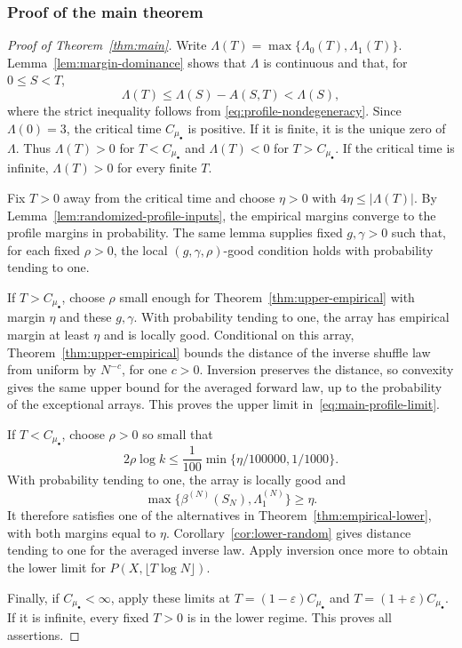 \subsubsection{Proof of the main theorem}

\begin{proof}[Proof of Theorem~\ref{thm:main}]
Write $\Lambda(T)=\max\{\Lambda_0(T),\Lambda_1(T)\}$.
Lemma~\ref{lem:margin-dominance} shows that $\Lambda$ is continuous and
that, for $0\le S<T$,
\[
 \Lambda(T)\le\Lambda(S)-A(S,T)<\Lambda(S),
\]
where the strict inequality follows from
\eqref{eq:profile-nondegeneracy}. Since $\Lambda(0)=3$, the critical
time $C_{\mu_\bullet}$ is positive. If it is finite, it is the unique
zero of $\Lambda$. Thus $\Lambda(T)>0$ for $T<C_{\mu_\bullet}$ and
$\Lambda(T)<0$ for $T>C_{\mu_\bullet}$. If the critical time is
infinite, $\Lambda(T)>0$ for every finite $T$.

Fix $T>0$ away from the critical time and choose $\eta>0$ with
$4\eta\le|\Lambda(T)|$. By
Lemma~\ref{lem:randomized-profile-inputs}, the empirical margins
converge to the profile margins in probability. The same lemma supplies
fixed $g,\gamma>0$ such that, for each fixed $\rho>0$, the local
$(g,\gamma,\rho)$-good condition holds with probability tending to one.

If $T>C_{\mu_\bullet}$, choose $\rho$ small enough for
Theorem~\ref{thm:upper-empirical} with margin $\eta$ and these
$g,\gamma$. With probability tending to one, the array has empirical
margin at least $\eta$ and is locally good. Conditional on this array,
Theorem~\ref{thm:upper-empirical} bounds the distance of the inverse
shuffle law from uniform by $N^{-c}$, for one $c>0$. Inversion preserves
the distance, so convexity gives the same upper bound for the averaged
forward law, up to the probability of the exceptional arrays. This
proves the upper limit in~\eqref{eq:main-profile-limit}.

If $T<C_{\mu_\bullet}$, choose $\rho>0$ so small that
\[
 2\rho\log k\le\frac1{100}\min\{\eta/100000,1/1000\}.
\]
With probability tending to one, the array is locally good and
\[
 \max\{\beta^{(N)}(S_N),\Lambda_1^{(N)}\}\ge\eta.
\]
It therefore satisfies one of the alternatives in
Theorem~\ref{thm:empirical-lower}, with both margins equal to $\eta$.
Corollary~\ref{cor:lower-random} gives distance tending to one for
the averaged inverse law. Apply inversion once more to obtain the
lower limit for $P(X,\lfloor T\log N\rfloor)$.

Finally, if $C_{\mu_\bullet}<\infty$, apply these limits at
$T=(1-\varepsilon)C_{\mu_\bullet}$ and
$T=(1+\varepsilon)C_{\mu_\bullet}$. If it is infinite, every fixed
$T>0$ is in the lower regime. This proves all assertions.
\end{proof}

